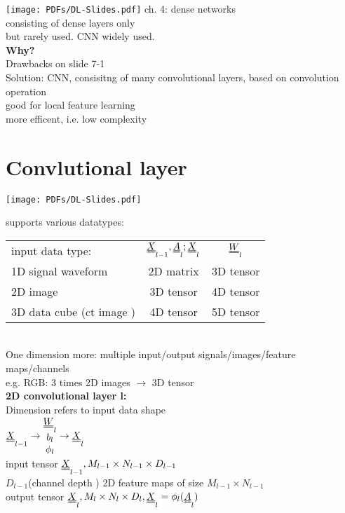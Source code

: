 \texttt{[image: PDFs/DL-Slides.pdf]}
ch. 4: dense networks \\
\textbullet consisting of dense layers only \\
\textbullet but rarely used. CNN widely used.\\
\textbf{Why?}\\
\textbullet Drawbacks on slide 7-1\\
Solution: CNN, consisitng of many convolutional layers, based on convolution operation\\
\textbullet good for local feature learning\\
\textbullet more efficent, i.e. low complexity
\section{Convlutional layer} 
\texttt{[image: PDFs/DL-Slides.pdf]}

supports various datatypes:\\
\begin{tabular}{lcc}
input data type:  &$  \X_{l-1}, \A_l ; \X_l$ &$ \W_l$ \\
1D signal waveform & 2D matrix & 3D tensor\\
2D image & 3D tensor & 4D tensor\\
3D data cube (ct image ) & 4D tensor & 5D tensor\\
\end{tabular}\\
One dimension more: multiple input/output signals/images/feature maps/channels\\
e.g. RGB: 3 times 2D images $ \rightarrow $ 3D tensor \\
\textbf{2D convolutional layer l:}\\
Dimension refers to input data shape \\
$ \X_{l-1}  \rightarrow \begin{matrix}
\W_l \\
b_l \\
\phi_l 
\end{matrix} \rightarrow \X_l$\\
\textbullet input tensor $  \X_{l-1} , M_{l-1 }  \times N_{l-1} \times D _{l-1 }$
\\
$ D_{l-1}$(channel depth ) 2D feature maps of size $ M_{l-1} \times N_{l-1 }   $ \\
\textbullet output tensor $  \X_l , M_l \times N_l \times D_l , \X_l = \phi_l (\A_l ) $
